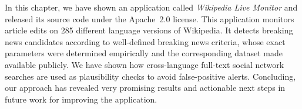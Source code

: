 In this chapter, we have shown an application called \emph{Wikipedia Live Monitor}
and released its source code under the Apache~2.0 license.
This application monitors article edits on 285 different language versions of Wikipedia.
It detects breaking news candidates according to well-defined breaking news criteria,
whose exact parameters were determined empirically
and the corresponding dataset made available publicly.
We have shown how cross-language full-text social network searches are used
as plausibility checks to avoid false-positive alerts.
Concluding, our approach has revealed very promising results
and actionable next steps in future work
for improving the application.


\clearpage

